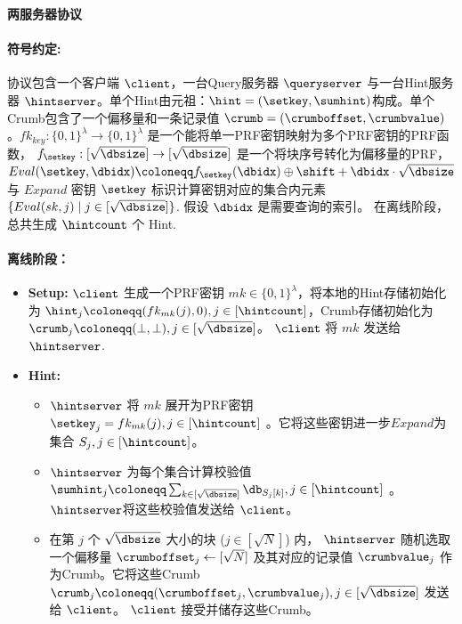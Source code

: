     \begin{mdframed}
        \centering
        \textbf{两服务器协议}

        \raggedright
        \paragraph{符号约定:} 协议包含一个客户端 $\client$，一台Query服务器 $\queryserver$ 与一台Hint服务器 $\hintserver$。单个Hint由元祖：$\hint=(\setkey,\sumhint)$构成。单个Crumb包含了一个偏移量和一条记录值 $\crumb=(\crumboffset,\crumbvalue)$。$fk_{key}:\{0,1\}^\lambda \to \{0,1\}^\lambda$ 是一个能将单一PRF密钥映射为多个PRF密钥的PRF函数， $f_{\setkey}: [\sqrt{\dbsize}]\to [\sqrt{\dbsize}]$ 是一个将块序号转化为偏移量的PRF，  $Eval(\setkey,\dbidx) \coloneqq f_{\setkey}(\dbidx)\oplus \shift + \dbidx\cdot\sqrt{\dbsize}$ 与 $Expand$ 密钥 $\setkey$ 标识计算密钥对应的集合内元素 $\{Eval(sk,j) \mid j\in[\sqrt{\dbsize}]\}$. 假设 $\dbidx$ 是需要查询的索引。 在离线阶段，总共生成 $\hintcount$ 个 Hint.

        \paragraph{离线阶段：}
        \begin{itemize}
            \item \textbf{Setup:} $\client$ 生成一个PRF密钥 $mk\in\{0,1\}^\lambda$，将本地的Hint存储初始化为 $\hint_j\coloneqq(fk_{mk}(j),0), j\in [\hintcount]$，Crumb存储初始化为 $\crumb_j\coloneqq (\bot,\bot), j\in [\sqrt{\dbsize}]$。 $\client$ 将 $mk$ 发送给 $\hintserver$.
            \item \textbf{Hint:}
                  \begin{itemize}
                      \item $\hintserver$ 将 $mk$ 展开为PRF密钥 $\setkey_j=fk_{mk}(j), j\in[\hintcount]$ 。它将这些密钥进一步$Expand$为集合 $S_j, j\in[\hintcount]$。
                      \item $\hintserver$ 为每个集合计算校验值 $\sumhint_j\coloneqq \sum_{k\in [\sqrt{\dbsize}]}\db_{S_{j}[k]}, j\in[\hintcount]$ 。$\hintserver$将这些校验值发送给 $\client$。
                      \item 在第 $j$ 个 $\sqrt{\dbsize}$ 大小的块 ($j\in[\sqrt{N}]$) 内， $\hintserver$ 随机选取一个偏移量 $\crumboffset_j\leftarrow [\sqrt{N}]$ 及其对应的记录值 $\crumbvalue_j$ 作为Crumb。它将这些Crumb $\crumb_j \coloneqq  (\crumboffset_j, \crumbvalue_j), j\in [\sqrt{\dbsize}]$ 发送给 $\client$。 $\client$ 接受并储存这些Crumb。
                  \end{itemize}
        \end{itemize}

\end{mdframed}
